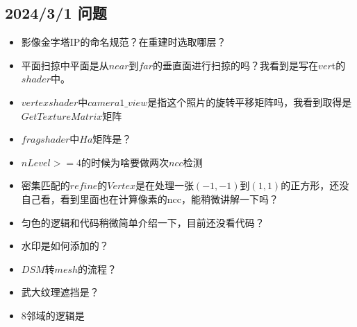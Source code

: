 \subsection{2024/3/1 问题}
\begin{itemize}
	\item 影像金字塔IP的命名规范？在重建时选取哪层？
	\item 平面扫掠中平面是从$near$到$far$的垂直面进行扫掠的吗？我看到是写在$ver$t的$shader$中。
	\item $vertexshader$中$camera1\_view$是指这个照片的旋转平移矩阵吗，我看到取得是$GetTextureMatrix$矩阵
	\item $frag shader$中$Ha$矩阵是？
	\item $nLevel >= 4$的时候为啥要做两次$ncc$检测
	\item 密集匹配的$refine$的$Vertex$是在处理一张$(-1, -1)$到$(1, 1)$的正方形，还没自己看，看到里面也在计算像素的ncc，能稍微讲解一下吗？
	\item 匀色的逻辑和代码稍微简单介绍一下，目前还没看代码？
	\item 水印是如何添加的？
	\item $DSM$转$mesh$的流程？
	\item 武大纹理遮挡是？
	\item 8邻域的逻辑是
\end{itemize}